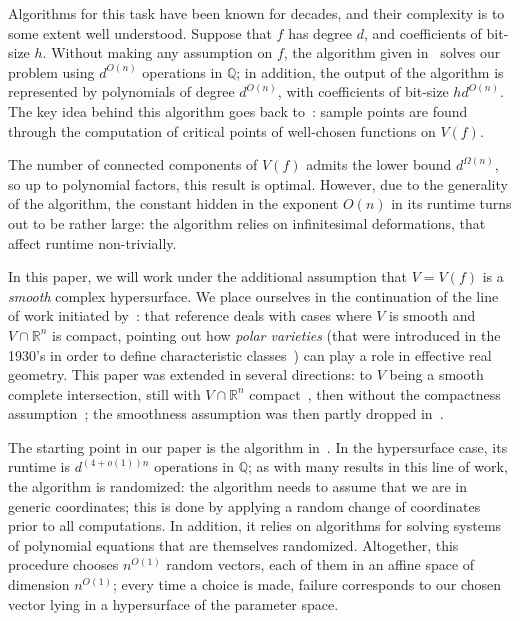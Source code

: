 \documentclass[sigconf]{acmart}
\def\Q{\mathbb{Q}}
\def\R{\mathbb{R}}
\begin{document}
Algorithms for this task have been known for decades, and their
complexity is to some extent well understood. Suppose that $f$ has
degree $d$, and coefficients of bit-size $h$. Without making any
assumption on $f$, the algorithm given
in~\cite[Section~13.1]{BaPoRo03} solves our problem using $d^{O(n)}$
operations in $\Q$; in addition, the output of the algorithm is
represented by polynomials of degree $d^{O(n)}$, with coefficients of
bit-size $hd^{O(n)}$.  The key idea behind this algorithm goes back
to~\cite{GrVo88}: sample points are found through the computation of
critical points of well-chosen functions on $V(f)$.

The number of connected components of $V(f)$ admits the lower bound
$d^{\Omega(n)}$, so up to polynomial factors, this result is
optimal. However, due to the generality of the algorithm, the constant
hidden in the exponent $O(n)$ in its runtime turns out to be rather
large: the algorithm relies on infinitesimal deformations, that affect
runtime non-trivially.

In this paper, we will work under the additional assumption that
$V=V(f)$ is a {\em smooth} complex hypersurface. We place ourselves in
the continuation of the line of work initiated by~\cite{BaGiHeMb97}:
that reference deals with cases where $V$ is smooth and $V \cap \R^n$
is compact, pointing out how {\em polar varieties} (that were
introduced in the 1930's in order to define characteristic
classes~\cite{Piene78,Teissier88}) can play a role in effective real
geometry. This paper was extended in several directions: to $V$ being
a smooth complete intersection, still with $V\cap \R^n$
compact~\cite{BaGiHeMb01}, then without the compactness
assumption~\cite{EMP,BaGiHePa05}; the smoothness assumption was then partly
dropped in~\cite{BaGiHe14,BaGiHeLePa12}.

The starting point in our paper is the algorithm in~\cite{EMP}. In the
hypersurface case, its runtime is $d^{(4+o(1))n}$ operations in $\Q$;
as with many results in this line of work, the algorithm is
randomized: the algorithm needs to assume that we are in generic
coordinates; this is done by applying a random change of coordinates
prior to all computations. In addition, it relies on algorithms for
solving systems of polynomial equations that are themselves
randomized.  Altogether, this procedure chooses $n^{O(1)}$ random
vectors, each of them in an affine space of dimension $n^{O(1)}$;
every time a choice is made, failure corresponds to our chosen vector
lying in a hypersurface of the parameter space.
\end{document}
